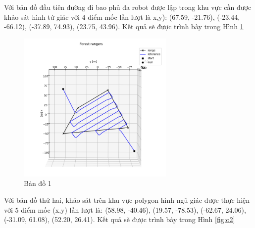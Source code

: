 Với bản đồ đầu tiên đường đi bao phủ đa robot được lập trong khu vực cần được khảo sát hình tứ giác với 4 điểm mốc lần lượt là x,y): (67.59, -21.76), (-23.44, -66.12), (-37.89, 74.93), (23.75, 43.96). Kết quả sẽ được trình bày trong Hình \ref{fig:o1} 

\begin{figure}[h!]
    \centering
    \includegraphics[width=0.68\textwidth]{chapter5/image/anh1_op.png}
    \caption{Bản đồ 1}
    \label{fig:o1}
\end{figure}

Với bản đồ thứ hai, khảo sát trên khu vực polygon hình ngũ giác được thực hiện với 5 điểm mốc (x,y) lần lượt là: (58.98, -40.46), (19.57, -78.53), (-62.67, 24.06), (-31.09, 61.08), (52.20, 26.41). Kết quả sẽ được trình bày trong Hình \ref{fig:o2}

